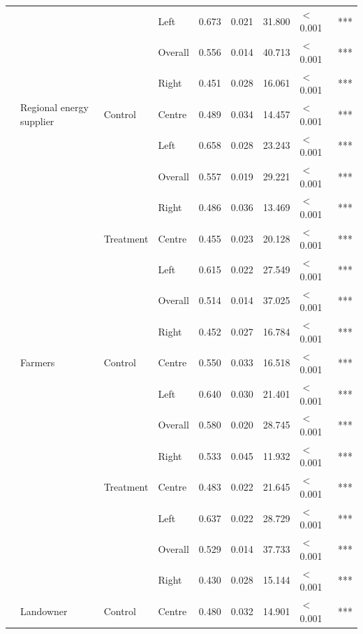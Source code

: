 \begin{longtable}[t]{>{\raggedright\arraybackslash}t{3cm}>{\raggedright\arraybackslash}t{3cm}>{\raggedright\arraybackslash}t{2.5cm}lrrrll}
\nopagebreak
 &  &  & Left & 0.673 & 0.021 & 31.800 & $<$0.001 & ***\\
\nopagebreak
 &  &  & Overall & 0.556 & 0.014 & 40.713 & $<$0.001 & ***\\
\nopagebreak
 &  &  & Right & 0.451 & 0.028 & 16.061 & $<$0.001 & ***\\
\nopagebreak
 & Regional energy supplier & Control & Centre & 0.489 & 0.034 & 14.457 & $<$0.001 & ***\\
\nopagebreak
 &  &  & Left & 0.658 & 0.028 & 23.243 & $<$0.001 & ***\\
\nopagebreak
 &  &  & Overall & 0.557 & 0.019 & 29.221 & $<$0.001 & ***\\
\nopagebreak
 &  &  & Right & 0.486 & 0.036 & 13.469 & $<$0.001 & ***\\
\nopagebreak
 &  & Treatment & Centre & 0.455 & 0.023 & 20.128 & $<$0.001 & ***\\
\nopagebreak
 &  &  & Left & 0.615 & 0.022 & 27.549 & $<$0.001 & ***\\
\nopagebreak
 &  &  & Overall & 0.514 & 0.014 & 37.025 & $<$0.001 & ***\\
\nopagebreak
 &  &  & Right & 0.452 & 0.027 & 16.784 & $<$0.001 & ***\\
\nopagebreak
 & Farmers & Control & Centre & 0.550 & 0.033 & 16.518 & $<$0.001 & ***\\
\nopagebreak
 &  &  & Left & 0.640 & 0.030 & 21.401 & $<$0.001 & ***\\
\nopagebreak
 &  &  & Overall & 0.580 & 0.020 & 28.745 & $<$0.001 & ***\\
\nopagebreak
 &  &  & Right & 0.533 & 0.045 & 11.932 & $<$0.001 & ***\\
\nopagebreak
 &  & Treatment & Centre & 0.483 & 0.022 & 21.645 & $<$0.001 & ***\\
\nopagebreak
 &  &  & Left & 0.637 & 0.022 & 28.729 & $<$0.001 & ***\\
\nopagebreak
 &  &  & Overall & 0.529 & 0.014 & 37.733 & $<$0.001 & ***\\
\nopagebreak
 &  &  & Right & 0.430 & 0.028 & 15.144 & $<$0.001 & ***\\
\nopagebreak
 & Landowner & Control & Centre & 0.480 & 0.032 & 14.901 & $<$0.001 & ***\\

\end{longtable}
